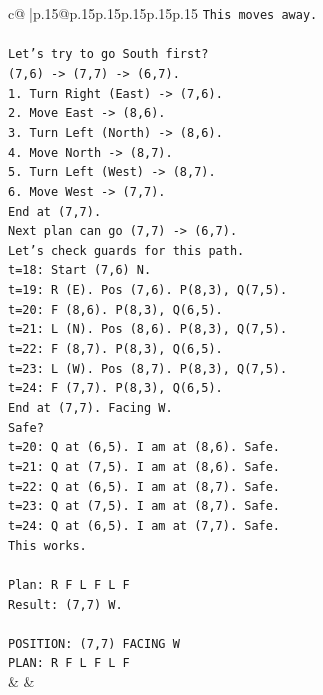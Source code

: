 \documentclass{article}
\begin{document}
{\begin{supertabular}{c@{$\;$}|p{.15\linewidth}@{}p{.15\linewidth}p{.15\linewidth}p{.15\linewidth}p{.15\linewidth}p{.15\linewidth}}
{{{\texttt{This moves away.} \\
\\ 
\texttt{Let's try to go South first?} \\
\texttt{(7,6) {-}> (7,7) {-}> (6,7).} \\
\texttt{1. Turn Right (East) {-}> (7,6).} \\
\texttt{2. Move East {-}> (8,6).} \\
\texttt{3. Turn Left (North) {-}> (8,6).} \\
\texttt{4. Move North {-}> (8,7).} \\
\texttt{5. Turn Left (West) {-}> (8,7).} \\
\texttt{6. Move West {-}> (7,7).} \\
\texttt{End at (7,7).} \\
\texttt{Next plan can go (7,7) {-}> (6,7).} \\
\texttt{Let's check guards for this path.} \\
\texttt{t=18: Start (7,6) N.} \\
\texttt{t=19: R (E). Pos (7,6). P(8,3), Q(7,5).} \\
\texttt{t=20: F (8,6). P(8,3), Q(6,5).} \\
\texttt{t=21: L (N). Pos (8,6). P(8,3), Q(7,5).} \\
\texttt{t=22: F (8,7). P(8,3), Q(6,5).} \\
\texttt{t=23: L (W). Pos (8,7). P(8,3), Q(7,5).} \\
\texttt{t=24: F (7,7). P(8,3), Q(6,5).} \\
\texttt{End at (7,7). Facing W.} \\
\texttt{Safe?} \\
\texttt{t=20: Q at (6,5). I am at (8,6). Safe.} \\
\texttt{t=21: Q at (7,5). I am at (8,6). Safe.} \\
\texttt{t=22: Q at (6,5). I am at (8,7). Safe.} \\
\texttt{t=23: Q at (7,5). I am at (8,7). Safe.} \\
\texttt{t=24: Q at (6,5). I am at (7,7). Safe.} \\
\texttt{This works.} \\
\\ 
\texttt{Plan: R F L F L F} \\
\texttt{Result: (7,7) W.} \\
\\ 
\texttt{POSITION: (7,7) FACING W} \\
\texttt{PLAN: R F L F L F} \\
            }
        }
    }
    & & \\ \\


\end{supertabular}}
\end{document}
